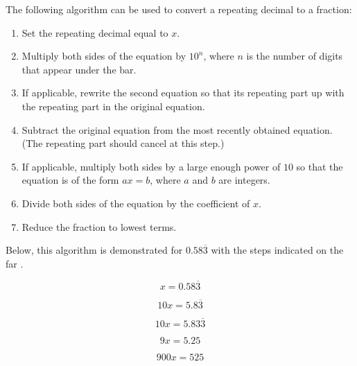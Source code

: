 \documentclass[12pt]{article}
\begin{document}

The following algorithm can be used to convert a repeating decimal to a fraction:

\begin{enumerate}

\item Set the repeating decimal equal to $x$.

\item Multiply both sides of the equation by $10^n$, where $n$ is the number of digits that appear under the bar.

\item If applicable, rewrite the second equation so that its repeating part  up with the repeating part in the original equation.

\item Subtract the original equation from the most recently obtained equation.  (The repeating part should cancel at this step.)

\item If applicable, multiply both sides by a large enough power of $10$ so that the equation is of the form $ax=b$, where $a$ and $b$ are integers.

\item Divide both sides of the equation by the coefficient of $x$.

\item Reduce the fraction to lowest terms.

\end{enumerate}

Below, this algorithm is demonstrated for $0.58\overline{3}$ with the steps indicated on the far .

\begin{equation}
x=0.58\overline{3}
\end{equation}

\begin{equation}
10x=5.8\overline{3}
\end{equation}

\begin{equation}
10x=5.83\overline{3}
\end{equation}

\begin{equation}
9x=5.25
\end{equation}

\begin{equation}
900x=525
\end{equation}
\end{document}
